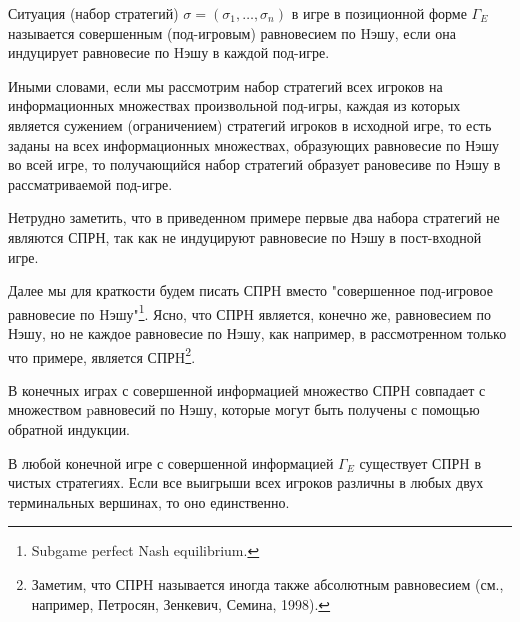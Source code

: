 \begin{definition}
Ситуация (набор стратегий) $\sigma=(\sigma_1,\ldots,\sigma_n)$ в
игре в позиционной форме $\Gamma_E$ называется совершенным
(под-игровым) равновесием по Hэшу, если она индуцирует равновесие по
Hэшу в каждой под-игре.
\end{definition}

Иными словами, если мы рассмотрим набор стратегий всех игроков на
информационных множествах произвольной под-игры, каждая из которых
является сужением (ограничением) стратегий игроков в исходной игре,
то есть заданы на всех информационных множествах, образующих
равновесие по Нэшу во всей игре, то получающийся набор стратегий
образует рановесиве по Нэшу в рассматриваемой под-игре.

Нетрудно заметить, что в приведенном примере первые два набора
стратегий не являются СПРН, так как не индуцируют равновесие по Нэшу в
пост-входной игре.

Далее мы для краткости будем писать СПРH вместо "совершенное
под-игровое равновесие по Hэшу"\footnote{ Subgame perfect Nash
equilibrium.}. Ясно, что СПРH является, конечно же, равновесием по Нэшу, но не
каждое равновесие по Нэшу, как например, в рассмотренном только что примере,
является СПРH\footnote{ Заметим, что СПРH называется иногда также
абсолютным равновесием (см., например, Петросян, Зенкевич, Семина,
1998).}.

В конечных играх с совершенной информацией  множество СПРH совпадает
с множеством pавновесий по Нэшу, которые могут быть получены с помощью обратной
индукции.

\begin{proposition}
В любой  конечной игре с совершенной информацией $\Gamma_E$
существует СПРH в чистых стратегиях. Если все выигрыши всех игроков
различны в любых двух терминальных вершинах, то оно единственно.
\end{proposition}

